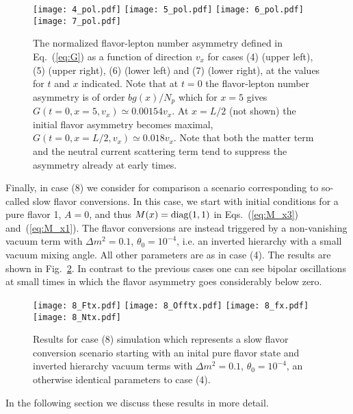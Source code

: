 \documentclass[prd,aps]{revtex4-2}
\begin{document}
\begin{figure}[p]
\texttt{[image: 4\_pol.pdf]}
\texttt{[image: 5\_pol.pdf]}
\texttt{[image: 6\_pol.pdf]}
\texttt{[image: 7\_pol.pdf]}
\caption[...]{The normalized flavor-lepton number asymmetry defined in Eq.~(\ref{eq:G}) as a function of direction $v_x$
for cases (4) (upper left), (5) (upper right), (6) (lower left) and (7) (lower right), at the values for $t$ and $x$ indicated.
Note that at $t=0$ the flavor-lepton number asymmetry is of order $bg(x)/N_p$ which for $x=5$ gives $G(t=0,x=5,v_x)\simeq0.00154v_x$.
At $x=L/2$ (not shown) the initial flavor asymmetry becomes maximal, $G(t=0,x=L/2,v_x)\simeq0.018v_x$.
Note that both the matter term and the neutral current scattering term tend to suppress the asymmetry already at early times.}
\label{fig:pol}
\end{figure}

Finally, in case (8) we consider for comparison a scenario corresponding to so-called slow flavor conversions.
In this case, we start with initial conditions for a pure flavor 1, $A=0$, and thus $M(x)={\rm diag}(1,1)$ in
Eqs.~(\ref{eq:M_x3}) and~(\ref{eq:M_x1}). The flavor conversions are instead triggered by a non-vanishing vacuum
term with $\Delta m^2=0.1$, $\theta_0=10^{-4}$, i.e. an inverted hierarchy with a small vacuum mixing angle. All
other parameters are as in case (4). The results are shown in Fig.~\ref{fig:8}. In contrast to the previous cases one can
see bipolar oscillations at small times in which the flavor asymmetry goes considerably below zero.

\begin{figure}[p]
\texttt{[image: 8\_Ftx.pdf]}
\texttt{[image: 8\_Offtx.pdf]}
\texttt{[image: 8\_fx.pdf]}
\texttt{[image: 8\_Ntx.pdf]}
\caption[...]{Results for case (8) simulation which represents a slow flavor conversion scenario starting with an inital pure
flavor state and inverted hierarchy vacuum terms with $\Delta m^2=0.1$, $\theta_0=10^{-4}$, an otherwise identical parameters to case (4).}
\label{fig:8}
\end{figure}

In the following section we discuss these results in more detail.
\end{document}
